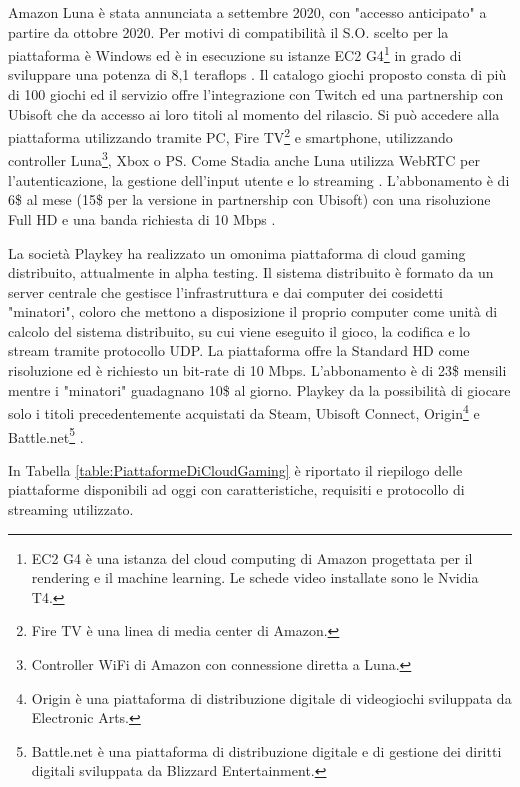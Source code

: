 Amazon Luna è stata annunciata a settembre 2020, con "accesso anticipato" a partire da ottobre 2020. Per motivi di compatibilità il S.O. scelto per la piattaforma è Windows ed è in esecuzione su istanze EC2 G4\footnote{EC2 G4 è una istanza del cloud computing di Amazon progettata per il rendering e il machine learning. Le schede video installate sono le Nvidia T4.} in grado di sviluppare una potenza di 8,1 teraflops \parencite{Amazon_Luna_GPU}. Il catalogo giochi proposto consta di più di 100 giochi ed il servizio offre l'integrazione con Twitch ed una partnership con Ubisoft che da accesso ai loro titoli al momento del rilascio. Si può accedere alla piattaforma utilizzando tramite PC, Fire TV\footnote{Fire TV è una linea di media center di Amazon.} e smartphone, utilizzando controller Luna\footnote{Controller WiFi di Amazon con connessione diretta a Luna.}, Xbox o PS. Come Stadia anche Luna utilizza WebRTC per l'autenticazione, la gestione dell'input utente e lo streaming \parencite{Amazon_Luna_WebRTC}. L'abbonamento è di 6\$ al mese (15\$ per la versione in partnership con Ubisoft) con una risoluzione Full HD e una banda richiesta di 10 Mbps \parencite{Amazon_Luna}.

La società Playkey ha realizzato un omonima piattaforma di cloud gaming distribuito, attualmente in alpha testing. Il sistema distribuito è formato da un server centrale che gestisce l'infrastruttura e dai computer dei cosidetti "minatori", coloro che mettono a disposizione il proprio computer come unità di calcolo del sistema distribuito, su cui viene eseguito il gioco, la codifica e lo stream tramite protocollo UDP. La piattaforma offre la Standard HD come risoluzione ed è richiesto un bit-rate di 10 Mbps. L'abbonamento è di 23\$ mensili mentre i "minatori" guadagnano 10\$ al giorno. Playkey da la possibilità di giocare solo i titoli precedentemente acquistati da Steam, Ubisoft Connect, Origin\footnote{Origin è una piattaforma di distribuzione digitale di videogiochi sviluppata da Electronic Arts.} e Battle.net\footnote{Battle.net è una piattaforma di distribuzione digitale e di gestione dei diritti digitali sviluppata da Blizzard Entertainment.} \parencite{Playkey}.

In Tabella \ref{table:PiattaformeDiCloudGaming} è riportato il riepilogo delle piattaforme disponibili ad oggi con caratteristiche, requisiti e protocollo di streaming utilizzato.

